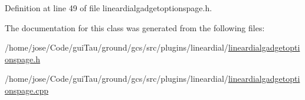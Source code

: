Definition at line 49 of file lineardialgadgetoptionspage.\-h.



The documentation for this class was generated from the following files\-:\begin{DoxyCompactItemize}
\item 
/home/jose/\-Code/gui\-Tau/ground/gcs/src/plugins/lineardial/\hyperlink{lineardialgadgetoptionspage_8h}{lineardialgadgetoptionspage.\-h}\item 
/home/jose/\-Code/gui\-Tau/ground/gcs/src/plugins/lineardial/\hyperlink{lineardialgadgetoptionspage_8cpp}{lineardialgadgetoptionspage.\-cpp}\end{DoxyCompactItemize}
